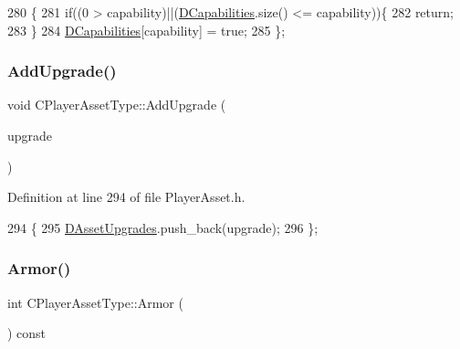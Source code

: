 \begin{DoxyCode}
280                                                            \{
281             \textcolor{keywordflow}{if}((0 > capability)||(\hyperlink{classCPlayerAssetType_a243f9161c56446b378dc42b51977fc58}{DCapabilities}.size() <= capability))\{
282                 \textcolor{keywordflow}{return};
283             \}
284             \hyperlink{classCPlayerAssetType_a243f9161c56446b378dc42b51977fc58}{DCapabilities}[capability] = \textcolor{keyword}{true};
285         \};
\end{DoxyCode}
\hypertarget{classCPlayerAssetType_ab5e951dff6a5300ee4f8361359296ebb}{}\label{classCPlayerAssetType_ab5e951dff6a5300ee4f8361359296ebb} 
\subsubsection{\texorpdfstring{Add\+Upgrade()}{AddUpgrade()}}
{\footnotesize\ttfamily void C\+Player\+Asset\+Type\+::\+Add\+Upgrade (\begin{DoxyParamCaption}\item[{std\+::shared\+\_\+ptr$<$ \hyperlink{classCPlayerUpgrade}{C\+Player\+Upgrade} $>$}]{upgrade }\end{DoxyParamCaption})\hspace{0.3cm}{\ttfamily [inline]}}



Definition at line 294 of file Player\+Asset.\+h.


\begin{DoxyCode}
294                                                                 \{
295             \hyperlink{classCPlayerAssetType_aeb8d5c3ea81ea56248d02a5e24d48001}{DAssetUpgrades}.push\_back(upgrade);
296         \};
\end{DoxyCode}
\hypertarget{classCPlayerAssetType_a2db08d14d9763a2ed0d7954a16ba0709}{}\label{classCPlayerAssetType_a2db08d14d9763a2ed0d7954a16ba0709} 
\subsubsection{\texorpdfstring{Armor()}{Armor()}}
{\footnotesize\ttfamily int C\+Player\+Asset\+Type\+::\+Armor (\begin{DoxyParamCaption}{ }\end{DoxyParamCaption}) const\hspace{0.3cm}{\ttfamily [inline]}}




